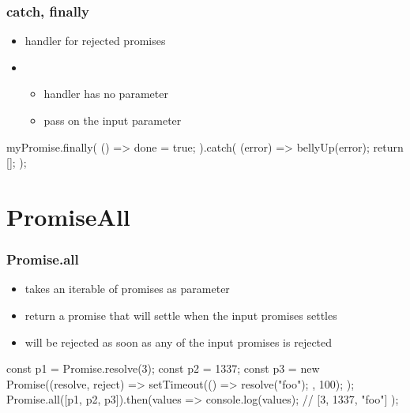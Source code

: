 \begin{frame}[fragile] \frametitle{catch, finally}
\begin{itemize}
  \item {} handler for rejected promises
  \item {}
  \begin{itemize}
    \item handler has no parameter
    \item pass on the input parameter
  \end{itemize}
\end{itemize}
\vspace{5mm}
\begin{CodeBox}{}
myPromise.finally(
  () => { done = true; }
).catch(
 (error) => {
   bellyUp(error);
   return [];
 }
);
\end{CodeBox}
\end{frame}

\section{PromiseAll}
\begin{frame}[fragile] \frametitle{Promise.all}
\begin{itemize}
  \item takes an iterable of promises as parameter 
  \item return a promise that will settle when the input promises settles
  \item will be rejected as soon as any of the input promises is rejected
\end{itemize}
\vspace{5mm}
\begin{CodeBox}{}
const p1 = Promise.resolve(3);
const p2 = 1337;
const p3 = new Promise((resolve, reject) => {
  setTimeout(() => {
    resolve("foo");
  }, 100);
}); 
Promise.all([p1, p2, p3]).then(values => { 
  console.log(values); // [3, 1337, "foo"] 
});
\end{CodeBox}
\end{frame}


